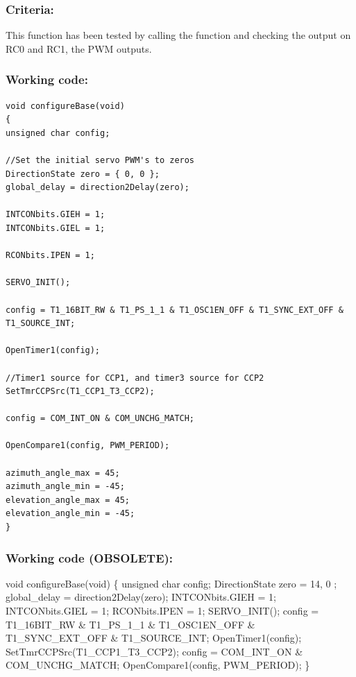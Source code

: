 \documentclass[]{report}
\begin{document}
\subsubsection{Criteria:}
This function has been tested by calling the function and checking the output on RC0 and RC1, the PWM outputs.

\subsubsection{Working code:}
\begin{lstlisting}
void configureBase(void)
{
unsigned char config;

//Set the initial servo PWM's to zeros
DirectionState zero = { 0, 0 };
global_delay = direction2Delay(zero);

INTCONbits.GIEH = 1;
INTCONbits.GIEL = 1;

RCONbits.IPEN = 1;

SERVO_INIT();

config = T1_16BIT_RW & T1_PS_1_1 & T1_OSC1EN_OFF & T1_SYNC_EXT_OFF & T1_SOURCE_INT;

OpenTimer1(config);

//Timer1 source for CCP1, and timer3 source for CCP2
SetTmrCCPSrc(T1_CCP1_T3_CCP2);

config = COM_INT_ON & COM_UNCHG_MATCH;

OpenCompare1(config, PWM_PERIOD);

azimuth_angle_max = 45;
azimuth_angle_min = -45;
elevation_angle_max = 45;
elevation_angle_min = -45;
}
\end{lstlisting}

\subsubsection{Working code (OBSOLETE):}
void configureBase(void) \newline
\{ \newline
unsigned char config; \newline
DirectionState zero = { 14, 0 }; \newline
global\_delay = direction2Delay(zero);\newline
INTCONbits.GIEH = 1;\newline
INTCONbits.GIEL = 1;\newline
RCONbits.IPEN = 1;\newline
SERVO\_INIT();\newline
config = T1\_16BIT\_RW \& T1\_PS\_1\_1 \& T1\_OSC1EN\_OFF \& T1\_SYNC\_EXT\_OFF \& T1\_SOURCE\_INT; \newline
OpenTimer1(config);\newline
SetTmrCCPSrc(T1\_CCP1\_T3\_CCP2);\newline
config = COM\_INT\_ON \& COM\_UNCHG\_MATCH;\newline
OpenCompare1(config, PWM\_PERIOD);\newline
\}
\end{document}

